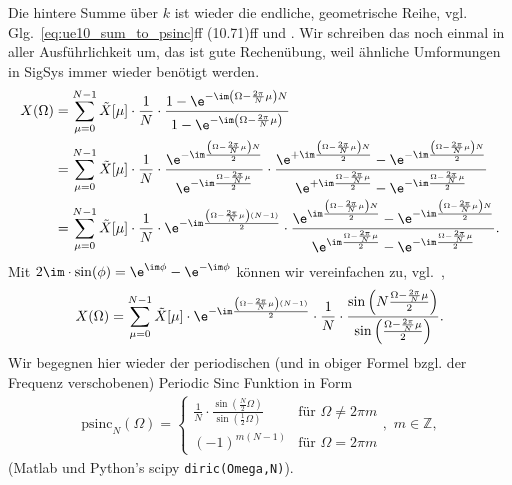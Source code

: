 \begin{ExCalc}
Die hintere Summe über $k$ ist wieder die endliche, geometrische Reihe,
vgl. Glg.~\eqref{eq:ue10_sum_to_psinc}ff (10.71)ff
und \cite[(3-39)]{Lyons2011}.
Wir schreiben das noch einmal in aller Ausführlichkeit um, das ist gute Rechenübung,
weil ähnliche Umformungen in SigSys immer wieder benötigt werden.
%
\begin{align}
X(\Omega)&=\sum_{\mu=0}^{N-1}\tilde{X}[\mu]\cdot\frac{1}{N}\cdot\frac{1-\e^{-\im\left(\Omega-\frac{2\pi}{N}\mu\right)N}}{1-\e^{-\im\left(\Omega-\frac{2\pi}{N}\mu\right)}}\\
&=\sum_{\mu=0}^{N-1}\tilde{X}[\mu]\cdot\frac{1}{N}\cdot\frac{\e^{-\im\frac{\left(\Omega-\frac{2\pi}{N}\mu\right)N}{2}}}{\e^{-\im\frac{\Omega-\frac{2\pi}{N}\mu}{2}}}\cdot\frac{\e^{+\im\frac{\left(\Omega-\frac{2\pi}{N}\mu\right)N}{2}}-\e^{-\im\frac{\left(\Omega-\frac{2\pi}{N}\mu\right)N}{2}}}{\e^{+\im\frac{\Omega-\frac{2\pi}{N}\mu}{2}}-\e^{-\im\frac{\Omega-\frac{2\pi}{N}\mu}{2}}}\\
&=\sum_{\mu=0}^{N-1}\tilde{X}[\mu]\cdot\frac{1}{N}\cdot\e^{-\im\frac{\left(\Omega-\frac{2\pi}{N}\mu\right)(N-1)}{2}}\cdot\frac{\e^{\im\frac{\left(\Omega-\frac{2\pi}{N}\mu\right)N}{2}}-\e^{-\im\frac{\left(\Omega-\frac{2\pi}{N}\mu\right)N}{2}}}{\e^{\im\frac{\Omega-\frac{2\pi}{N}\mu}{2}}-\e^{-\im\frac{\Omega-\frac{2\pi}{N}\mu}{2}}}.
\end{align}
%
Mit $2\im\cdot\sin(\phi)=\e^{\im \phi}-\e^{-\im \phi}$ können wir vereinfachen
zu, vgl.~\cite[(2.41)]{Moeser2011}, \cite[(2.142)]{Rabiner1975}
%
\begin{equation}
X(\Omega)=\sum_{\mu=0}^{N-1}\tilde{X}[\mu]\cdot\e^{-\im\frac{\left(\Omega-\frac{2\pi}{N}\mu\right)(N-1)}{2}}\cdot\frac{1}{N}\cdot\frac{\sin\left(N\frac{\Omega-\frac{2\pi}{N}\mu}{2}\right)}{\sin\left(\frac{\Omega-\frac{2\pi}{N}\mu}{2}\right)}.
\end{equation}
%
Wir begegnen hier wieder der periodischen (und in obiger Formel bzgl. der Frequenz verschobenen) Periodic Sinc Funktion in Form
%
\begin{align}
\text{psinc}_N(\Omega)=\begin{cases}\frac{1}{N}\cdot\frac{\sin\left(\frac{N}{2}\Omega\right)}{\sin\left(\frac{1}{2}\Omega\right)}&\text{für }\Omega\neq2\pi m\\
(-1)^{m(N-1)}&\text{für }\Omega=2\pi m\end{cases},\,\,m\in\mathbb{Z},
\end{align}
%
(Matlab und Python's scipy \texttt{diric(Omega,N)}).


\end{ExCalc}
